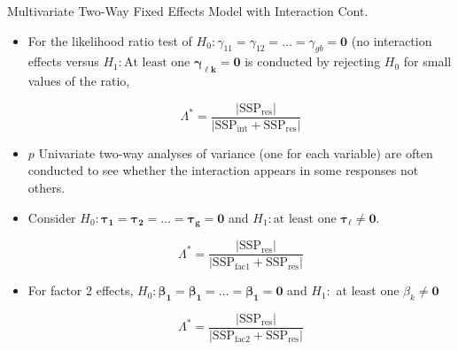 \documentclass[8pt]{beamer}
\begin{document}
    \begin{frame}{Multivariate Two-Way Fixed Effects Model with Interaction Cont. }
        \begin{itemize}
            \item For the likelihood ratio test of $H_{0}:\gamma_{11} = \gamma_{12} = \hdots = \gamma_{gb} = \mathbf{0}$ (no interaction effects versus $H_{1}: \text{At least one } \mathbf{\gamma_{\ell k}} = \mathbf{0}$ is conducted by rejecting $H_{0}$ for small values of the ratio, 
            
            \begin{equation}
                \Lambda^{*} = \frac{|\text{SSP}_{\text{res}}|}{|\text{SSP}_{\text{int}} + \text{SSP}_{\text{res}}|}
            \end{equation}
            
            \item $p$ Univariate two-way analyses of variance (one for each variable) are often conducted to see whether the interaction appears in some responses not others. 
            
            \item Consider $H_{0}: \mathbf{\tau_{1} = \tau_{2} = \hdots = \tau_{g} = 0}$ and $H_{1}: \text{at least one } \mathbf{\tau_{\ell} \neq 0}$.
            
            \begin{equation}
                \Lambda^{*} = \frac{|\text{SSP}_{\text{res}}|}{|\text{SSP}_{\text{fac1}} + \text{SSP}_{\text{res}}|}
            \end{equation}
            
            \item For factor 2 effects, $H_{0}: \mathbf{\beta_{1}} = \mathbf{\beta_{1}} = \hdots = \mathbf{\beta_{1}} = \mathbf{0}$ and $H_{1}:$ at least one $\beta_{k} \neq \mathbf{0}$
            
            \begin{equation}
                \Lambda^{*} = \frac{|\text{SSP}_{\text{res}}|}{|\text{SSP}_{\text{fac2}} + \text{SSP}_{\text{res}}|}
            \end{equation}
            
        \end{itemize}
    \end{frame}
    
\end{document}
